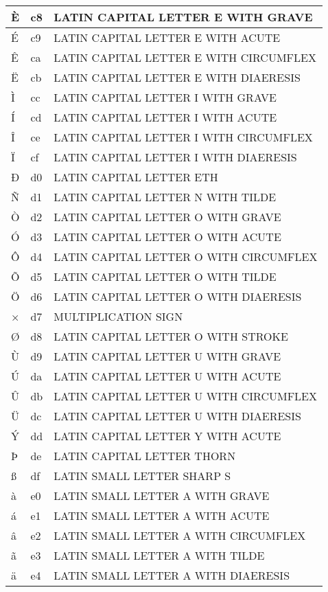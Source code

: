 \documentclass[12pt,letterpaper,openany]{book}
\begin{document}
\begin{center}
\begin{supertabular}{|m{0.25in}|m{0.5in}|m{4in}|}
È & c8 & LATIN CAPITAL LETTER E WITH GRAVE\\\hline
É & c9 & LATIN CAPITAL LETTER E WITH ACUTE\\\hline
Ê & ca & LATIN CAPITAL LETTER E WITH CIRCUMFLEX\\\hline
Ë & cb & LATIN CAPITAL LETTER E WITH DIAERESIS\\\hline
Ì & cc & LATIN CAPITAL LETTER I WITH GRAVE\\\hline
Í & cd & LATIN CAPITAL LETTER I WITH ACUTE\\\hline
Î & ce & LATIN CAPITAL LETTER I WITH CIRCUMFLEX\\\hline
Ï & cf & LATIN CAPITAL LETTER I WITH DIAERESIS\\\hline
Ð & d0 & LATIN CAPITAL LETTER ETH\\\hline
Ñ & d1 & LATIN CAPITAL LETTER N WITH TILDE\\\hline
Ò & d2 & LATIN CAPITAL LETTER O WITH GRAVE\\\hline
Ó & d3 & LATIN CAPITAL LETTER O WITH ACUTE\\\hline
Ô & d4 & LATIN CAPITAL LETTER O WITH CIRCUMFLEX\\\hline
Õ & d5 & LATIN CAPITAL LETTER O WITH TILDE\\\hline
Ö & d6 & LATIN CAPITAL LETTER O WITH DIAERESIS\\\hline
× & d7 & MULTIPLICATION SIGN\\\hline
Ø & d8 & LATIN CAPITAL LETTER O WITH STROKE\\\hline
Ù & d9 & LATIN CAPITAL LETTER U WITH GRAVE\\\hline
Ú & da & LATIN CAPITAL LETTER U WITH ACUTE\\\hline
Û & db & LATIN CAPITAL LETTER U WITH CIRCUMFLEX\\\hline
Ü & dc & LATIN CAPITAL LETTER U WITH DIAERESIS\\\hline
Ý & dd & LATIN CAPITAL LETTER Y WITH ACUTE\\\hline
Þ & de & LATIN CAPITAL LETTER THORN\\\hline
ß & df & LATIN SMALL LETTER SHARP S\\\hline
à & e0 & LATIN SMALL LETTER A WITH GRAVE\\\hline
á & e1 & LATIN SMALL LETTER A WITH ACUTE\\\hline
â & e2 & LATIN SMALL LETTER A WITH CIRCUMFLEX\\\hline
ã & e3 & LATIN SMALL LETTER A WITH TILDE\\\hline
ä & e4 & LATIN SMALL LETTER A WITH DIAERESIS\\\hline

\end{supertabular}
\end{center}
\end{document}

